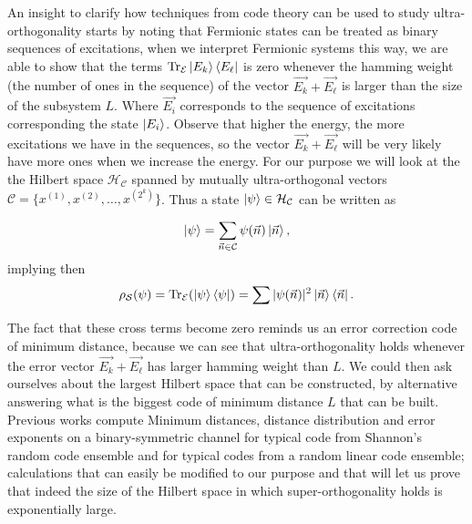 \indent An insight to clarify how techniques from code theory can be used to study ultra-orthogonality starts by noting that Fermionic states can be treated as binary sequences of excitations, when we interpret Fermionic systems this way, we are able to show that the terms $\operatorname{Tr}_{\mathcal{E}} \mathinner{|{E_k}\rangle}\mathinner{\langle{E_\ell}|} $ is zero whenever the hamming weight (the number of ones in the sequence) of the vector $\vec{E_k}+\vec{E_\ell}$ is larger than the size of the subsystem $L$. Where $\vec{E_i}$ corresponds to the sequence of excitations corresponding the state $ \mathinner{|{E_i}\rangle}$. Observe that higher the energy, the more excitations we have in the sequences, so the vector $\vec{E_k}+\vec{E_\ell}$ will be very likely have more ones when we increase the energy. For our purpose we will look at the the Hilbert space $\mathcal{H}_{\mathcal{C}}$ spanned by mutually ultra-orthogonal vectors $\mathcal{C}=\{x^{(1)},x^{(2)},\ldots, x^{(2^k)}\}$. Thus a state $\mathinner{|{\psi}\rangle}\in \mathcal{H}_{\mathcal{C}}$ can be written as

\begin{equation}
\mathinner{|{\psi}\rangle} = \sum_{\vec{n}\in \mathcal{C}}\psi(\vec{n})\mathinner{|{\vec{n}}\rangle},
\end{equation}
implying then
\begin{equation}
\rho_{\mathcal{S}}(\psi) = \operatorname{Tr}_{\mathcal{E}}(\mathinner{|{\psi}\rangle}\mathinner{\langle{\psi}|}) = \sum |\psi(\vec{n})|^2 \mathinner{|{\vec{n}}\rangle}\mathinner{\langle{\vec{n}}|}.
\end{equation}

\indent The fact that these cross terms become zero reminds us an error correction code of minimum distance, because we can see that ultra-orthogonality holds whenever the error vector $\vec{E_k}+\vec{E_\ell}$ has larger hamming weight than $L$. We could then ask ourselves about the largest Hilbert space that can be constructed, by alternative answering what is the biggest code of minimum distance $L$ that can be built. Previous works \cite{barg_random_2002} compute Minimum distances, distance distribution and error exponents on a binary-symmetric channel for typical code from Shannon's random code ensemble and for typical codes from a random linear code ensemble; calculations that can easily be modified to our purpose and that will let us prove that indeed the size of the Hilbert space in which super-orthogonality holds is exponentially large.\\

